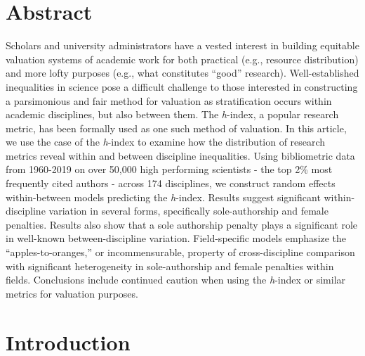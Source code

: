 \documentclass[
  10pt,
  letterpaper,
]{article}
\begin{document}
\newpage

{\Large
\textbf{} %
}

\section*{Abstract}
Scholars and university administrators have a vested interest in
building equitable valuation systems of academic work for both practical
(e.g., resource distribution) and more lofty purposes (e.g., what
constitutes ``good'' research). Well-established inequalities in science
pose a difficult challenge to those interested in constructing a
parsimonious and fair method for valuation as stratification occurs
within academic disciplines, but also between them. The \emph{h}-index,
a popular research metric, has been formally used as one such method of
valuation. In this article, we use the case of the \emph{h}-index to
examine how the distribution of research metrics reveal within and
between discipline inequalities. Using bibliometric data from 1960-2019
on over 50,000 high performing scientists - the top 2\% most frequently
cited authors - across 174 disciplines, we construct random effects
within-between models predicting the \emph{h}-index. Results suggest
significant within-discipline variation in several forms, specifically
sole-authorship and female penalties. Results also show that a sole
authorship penalty plays a significant role in well-known
between-discipline variation. Field-specific models emphasize the
``apples-to-oranges,'' or incommensurable, property of cross-discipline
comparison with significant heterogeneity in sole-authorship and female
penalties within fields. Conclusions include continued caution when
using the \emph{h}-index or similar metrics for valuation purposes.


\linenumbers
\section{Introduction}\label{introduction}
\end{document}
